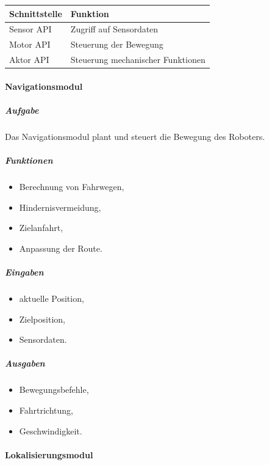\documentclass[
  a4paper,
  12pt,
  DIV=12,        %
  parskip=half,  %
  headings=small %
]{scrartcl}
\theoremstyle{definition}
\providecommand{\tightlist}{%
  \setlength{\itemsep}{0pt}\setlength{\parskip}{0pt}}
\theoremstyle{definition}
\begin{document}
\begin{longtable}[]{@{}ll@{}}
\toprule\noalign{}
Schnittstelle & Funktion \\
\midrule\noalign{}
\endhead
\bottomrule\noalign{}
\endlastfoot
Sensor API & Zugriff auf Sensordaten \\
Motor API & Steuerung der Bewegung \\
Aktor API & Steuerung mechanischer Funktionen \\
\end{longtable}

\paragraph{Navigationsmodul}\label{navigationsmodul}

\subparagraph{Aufgabe}\label{aufgabe-7}

Das Navigationsmodul plant und steuert die Bewegung des Roboters.

\subparagraph{Funktionen}\label{funktionen-1}

\begin{itemize}
\tightlist
\item
  Berechnung von Fahrwegen,
\item
  Hindernisvermeidung,
\item
  Zielanfahrt,
\item
  Anpassung der Route.
\end{itemize}

\subparagraph{Eingaben}\label{eingaben}

\begin{itemize}
\tightlist
\item
  aktuelle Position,
\item
  Zielposition,
\item
  Sensordaten.
\end{itemize}

\subparagraph{Ausgaben}\label{ausgaben}

\begin{itemize}
\tightlist
\item
  Bewegungsbefehle,
\item
  Fahrtrichtung,
\item
  Geschwindigkeit.
\end{itemize}

\paragraph{Lokalisierungsmodul}\label{lokalisierungsmodul}
\end{document}
